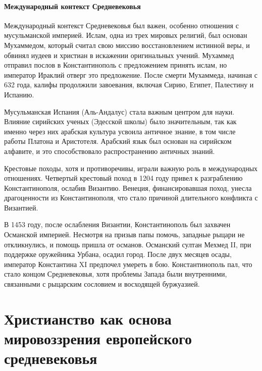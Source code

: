 \paragraph{Международный контекст Средневековья}

Международный контекст Средневековья был важен, особенно отношения с мусульманской империей. Ислам, одна из трех мировых религий, был основан Мухаммедом, который считал свою миссию восстановлением истинной веры, и обвинял иудеев и христиан в искажении оригинальных учений. Мухаммед отправил послов в Константинополь с предложением принять ислам, но император Ираклий отверг это предложение. После смерти Мухаммеда, начиная с 632 года, калифы продолжили завоевания, включая Сирию, Египет, Палестину и Испанию.

Мусульманская Испания (Аль-Андалус) стала важным центром для науки. Влияние сирийских ученых (Эдесской школы) было значительным, так как именно через них арабская культура усвоила античное знание, в том числе работы Платона и Аристотеля. Арабский язык был основан на сирийском алфавите, и это способствовало распространению античных знаний.

Крестовые походы, хотя и противоречивы, играли важную роль в международных отношениях. Четвертый крестовый поход в 1204 году привел к разграблению Константинополя, ослабив Византию. Венеция, финансировавшая поход, унесла драгоценности из Константинополя, что стало причиной длительного конфликта с Византией.

В 1453 году, после ослабления Византии, Константинополь был захвачен Османской империей. Несмотря на призыв папы помочь, западные рыцари не откликнулись, и помощь пришла от османов. Османский султан Мехмед II, при поддержке оружейника Урбана, осадил город. После двух месяцев осады, император Константина XI предпочел умереть в бою. Константинополь пал, что стало концом Средневековья, хотя проблемы Запада были внутренними, связанными с рыцарским сословием и восходящей буржуазией.

\section{Христианство как основа мировоззрения европейского средневековья}


